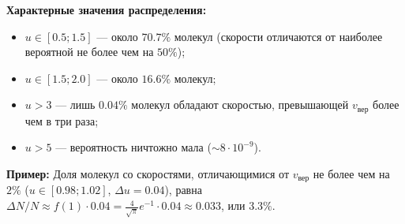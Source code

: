 \begin{remark}
\textbf{Характерные значения распределения:}
\begin{itemize}
    \item $u \in [0.5; 1.5]$ --- около $70.7\%$ молекул (скорости отличаются от наиболее вероятной не более чем на $50\%$);
    \item $u \in [1.5; 2.0]$ --- около $16.6\%$ молекул;
    \item $u > 3$ --- лишь $0.04\%$ молекул обладают скоростью, превышающей $v_{\text{вер}}$ более чем в три раза;
    \item $u > 5$ --- вероятность ничтожно мала ($\sim 8 \cdot 10^{-9}$).
\end{itemize}
\textbf{Пример:} Доля молекул со скоростями, отличающимися от $v_{\text{вер}}$ не более чем на $2\%$ ($u \in [0.98; 1.02]$, $\Delta u = 0.04$), равна $\Delta N/N \approx f(1) \cdot 0.04 = \frac{4}{\sqrt{\pi}} e^{-1} \cdot 0.04 \approx 0.033$, или $3.3\%$.
\end{remark}
